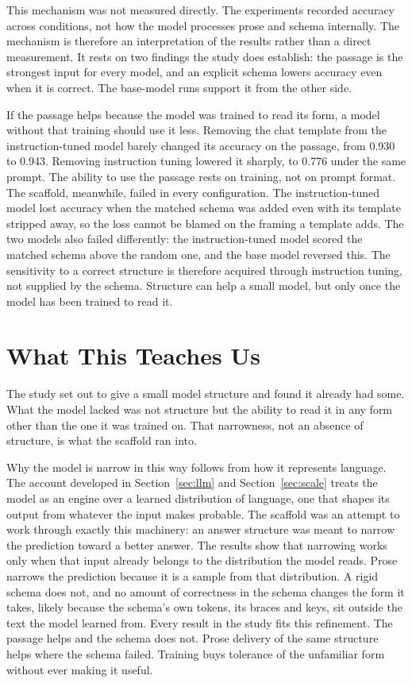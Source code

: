 \documentclass[master]{thesis}
\newcommand{\sref}[1]{Section~\ref{#1}}  %
\begin{document}
This mechanism was not measured directly. The experiments recorded accuracy across conditions, not how the model processes prose and schema internally. The mechanism is therefore an interpretation of the results rather than a direct measurement. It rests on two findings the study does establish: the passage is the strongest input for every model, and an explicit schema lowers accuracy even when it is correct. The base-model runs support it from the other side.

If the passage helps because the model was trained to read its form, a model without that training should use it less. Removing the chat template from the instruction-tuned model barely changed its accuracy on the passage, from 0.930 to 0.943. Removing instruction tuning lowered it sharply, to 0.776 under the same prompt. The ability to use the passage rests on training, not on prompt format. The scaffold, meanwhile, failed in every configuration. The instruction-tuned model lost accuracy when the matched schema was added even with its template stripped away, so the loss cannot be blamed on the framing a template adds. The two models also failed differently: the instruction-tuned model scored the matched schema above the random one, and the base model reversed this. The sensitivity to a correct structure is therefore acquired through instruction tuning, not supplied by the schema. Structure can help a small model, but only once the model has been trained to read it.

\section{What This Teaches Us}
\label{sec:teaches}

The study set out to give a small model structure and found it already had some. What the model lacked was not structure but the ability to read it in any form other than the one it was trained on. That narrowness, not an absence of structure, is what the scaffold ran into.

Why the model is narrow in this way follows from how it represents language. The account developed in \sref{sec:llm} and \sref{sec:scale} treats the model as an engine over a learned distribution of language, one that shapes its output from whatever the input makes probable. The scaffold was an attempt to work through exactly this machinery: an answer structure was meant to narrow the prediction toward a better answer. The results show that narrowing works only when that input already belongs to the distribution the model reads. Prose narrows the prediction because it is a sample from that distribution. A rigid schema does not, and no amount of correctness in the schema changes the form it takes, likely because the schema's own tokens, its braces and keys, sit outside the text the model learned from. Every result in the study fits this refinement. The passage helps and the schema does not. Prose delivery of the same structure helps where the schema failed. Training buys tolerance of the unfamiliar form without ever making it useful.
\end{document}
